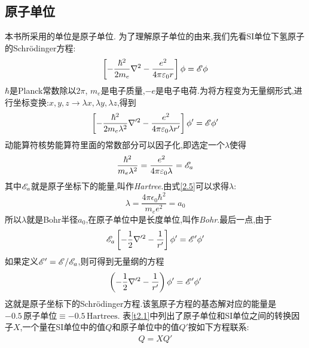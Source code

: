\subsection{原子单位}
\label{sec2.1.1}
本书所采用的单位是原子单位. 为了理解原子单位的由来,我们先看SI单位下氢原子的Schr\"odinger方程:
\begin{align}
\label{2.3}
\left[-\frac{\hbar^2}{2m_e}\nabla^2-\frac{e^2}{4\pi\varepsilon_0r}\right]\phi=\mathscr{E}\phi
\end{align}
$ \hbar $是Planck常数除以$ 2\pi $, $ m_e $是电子质量,$ -e $是电子电荷.为将方程变为无量纲形式,进行坐标变换:$x,y,z\to\lambda x,\lambda y,\lambda z$,得到
\begin{equation}
\label{2.4}
\left[-\frac{\hbar^2}{2m_e\lambda^2}\nabla'^2-\frac{e^2}{4\pi\varepsilon_0\lambda r'}\right]\phi'=\mathscr{E}\phi'
\end{equation}
动能算符核势能算符里面的常数部分可以因子化,即选定一个$ \lambda $使得
\begin{equation}
\label{2.5}
\frac{\hbar^2}{m_e\lambda^2}=\frac{e^2}{4\pi\varepsilon_0\lambda}=\mathscr{E}_a
\end{equation}
其中$ \mathscr{E}_a $就是原子坐标下的能量,叫作\emph{Hartree}.由式\ref{2.5}可以求得$ \lambda $:
\begin{equation}
\label{2.6}
\lambda=\frac{4\pi\epsilon_0\hbar^2}{m_ee^2}=a_0
\end{equation}
所以$ \lambda $就是Bohr半径$ a_0 $,在原子单位中是长度单位,叫作\emph{Bohr}.最后一点,由于
\begin{equation}
\mathscr{E}_a\left[-\frac{1}{2}\nabla'^2-\frac{1}{r'}\right]\phi'=\mathscr{E}'\phi'	
\end{equation}
如果定义$ \mathscr{E}'=\mathscr{E}/\mathscr{E}_a $,则可得到无量纲的方程
\begin{equation}
\left(-\frac{1}{2}\nabla'^2-\frac{1}{r'}\right)\phi'=\mathscr{E}'\phi'
\end{equation}
这就是原子坐标下的Schr\"odinger方程.该氢原子方程的基态解对应的能量是$-0.5\,\text{原子单位}\equiv -0.5\,\text{Hartrees}$. 表\ref{t2.1}中列出了原子单位和SI单位之间的转换因子$ X $,一个量在SI单位中的值$ Q $和原子单位中的值$ Q' $按如下方程联系:
\begin{eqnarray}
\label{2.9}
Q=XQ'
\end{eqnarray}

